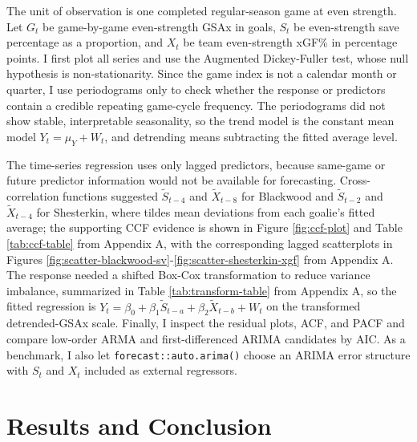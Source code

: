 \documentclass[
  10pt,
]{article}
\begin{document}
The unit of observation is one completed regular-season game at even strength. Let \(G_t\) be game-by-game even-strength GSAx in goals, \(S_t\) be even-strength save percentage as a proportion, and \(X_t\) be team even-strength xGF\% in percentage points. I first plot all series and use the Augmented Dickey-Fuller test, whose null hypothesis is non-stationarity. Since the game index is not a calendar month or quarter, I use periodograms only to check whether the response or predictors contain a credible repeating game-cycle frequency. The periodograms did not show stable, interpretable seasonality, so the trend model is the constant mean model \(Y_t=\mu_Y+W_t\), and detrending means subtracting the fitted average level.

The time-series regression uses only lagged predictors, because same-game or future predictor information would not be available for forecasting. Cross-correlation functions suggested \(\tilde{S}_{t-4}\) and \(\tilde{X}_{t-8}\) for Blackwood and \(\tilde{S}_{t-2}\) and \(\tilde{X}_{t-4}\) for Shesterkin, where tildes mean deviations from each goalie's fitted average; the supporting CCF evidence is shown in Figure \ref{fig:ccf-plot} and Table \ref{tab:ccf-table} from Appendix A, with the corresponding lagged scatterplots in Figures \ref{fig:scatter-blackwood-sv}-\ref{fig:scatter-shesterkin-xgf} from Appendix A. The response needed a shifted Box-Cox transformation to reduce variance imbalance, summarized in Table \ref{tab:transform-table} from Appendix A, so the fitted regression is \(Y_t=\beta_0+\beta_1\tilde{S}_{t-a}+\beta_2\tilde{X}_{t-b}+W_t\) on the transformed detrended-GSAx scale. Finally, I inspect the residual plots, ACF, and PACF and compare low-order ARMA and first-differenced ARIMA candidates by AIC. As a benchmark, I also let \texttt{forecast::auto.arima()} choose an ARIMA error structure with \(S_t\) and \(X_t\) included as external regressors.

\section{Results and Conclusion}\label{results-and-conclusion}

\begin{table}[H]
\centering
\caption{\label{tab:sample-summary}Matched game-by-game even-strength samples.}
\centering
{}
\end{table}
\end{document}

